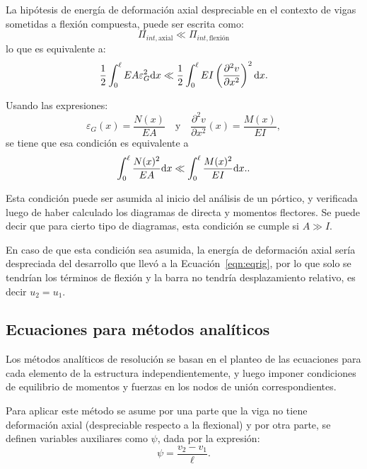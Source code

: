 La hipótesis de energía de deformación axial despreciable en el contexto de vigas sometidas a flexión compuesta, puede ser escrita como:
%
\begin{equation}
	\Pi_{int,\text{axial}} \ll \Pi_{int,\text{flexión}}
\end{equation}
%
lo que es equivalente a:%
%
\begin{equation}
	\frac{1}{2} \int_{0}^{\ell} E A  \varepsilon_G^2 {\text{d}} x \ll \frac{1}{2} \int_{0}^{\ell} EI \left( \frac{\partial^2 v}{\partial x^2}\right)^2 {\text{d}} x.
\end{equation}

Usando las expresiones: 
\begin{equation}
	\varepsilon_G(x) = \frac{	N (x) }{E A}
	\quad
	\text{y}
	\quad
	\frac{\partial^2 v}{\partial x^2}(x) = \frac{	M (x) }{E I} ,
\end{equation}
se tiene que esa condición es equivalente a 
%
\begin{equation}
	\int_{0}^{\ell} \frac{	N (x)^2 }{E A} {\text{d}} x \ll \int_{0}^{\ell} \frac{	M (x)^2 }{E I}  {\text{d}} x..
\end{equation}


Esta condición puede ser asumida al inicio del análisis de un pórtico, y verificada luego de haber calculado los diagramas de directa y momentos flectores. %
%
Se puede decir que para cierto tipo de diagramas, esta condición se cumple si $A \gg I$.

En caso de que esta condición sea asumida, la energía de deformación axial sería despreciada del desarrollo que llevó a la Ecuación~\eqref{eqn:eqrig}, por lo que solo se tendrían los términos de flexión y la barra no tendría desplazamiento relativo, es decir $u_2=u_1$.



\subsection{Ecuaciones para métodos analíticos}

Los métodos analíticos de resolución se basan en el planteo de las ecuaciones para cada elemento de la estructura independientemente, y luego imponer condiciones de equilibrio de momentos y fuerzas en los nodos de unión correspondientes. %

Para aplicar este método se asume por una parte que la viga no tiene deformación axial (despreciable respecto a la flexional) y por otra parte, se definen variables auxiliares como $\psi$, dada por la expresión:
%
\begin{equation}
  \psi = \frac{v_2 - v_1}{\ell}.
\end{equation}
%

